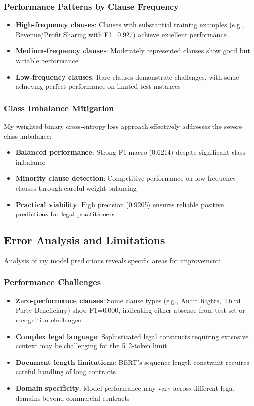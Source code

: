 \subsubsection{Performance Patterns by Clause Frequency}
\begin{itemize}
\item \textbf{High-frequency clauses}: Clauses with substantial training examples (e.g., Revenue/Profit Sharing with F1=0.927) achieve excellent performance
\item \textbf{Medium-frequency clauses}: Moderately represented clauses show good but variable performance
\item \textbf{Low-frequency clauses}: Rare clauses demonstrate challenges, with some achieving perfect performance on limited test instances
\end{itemize}

\subsubsection{Class Imbalance Mitigation}
My weighted binary cross-entropy loss approach effectively addresses the severe class imbalance:

\begin{itemize}
\item \textbf{Balanced performance}: Strong F1-macro (0.6214) despite significant class imbalance
\item \textbf{Minority clause detection}: Competitive performance on low-frequency clauses through careful weight balancing
\item \textbf{Practical viability}: High precision (0.9205) ensures reliable positive predictions for legal practitioners
\end{itemize}

\subsection{Error Analysis and Limitations}
\label{subsec:error_analysis}

Analysis of my model predictions reveals specific areas for improvement:

\subsubsection{Performance Challenges}
\begin{itemize}
\item \textbf{Zero-performance clauses}: Some clause types (e.g., Audit Rights, Third Party Beneficiary) show F1=0.000, indicating either absence from test set or recognition challenges
\item \textbf{Complex legal language}: Sophisticated legal constructs requiring extensive context may be challenging for the 512-token limit
\item \textbf{Document length limitations}: BERT's sequence length constraint requires careful handling of long contracts
\item \textbf{Domain specificity}: Model performance may vary across different legal domains beyond commercial contracts
\end{itemize}

